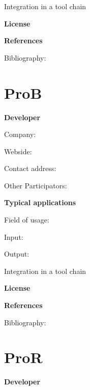 \documentclass{./template/openetcs_report}
\begin{document}
	Integration in a tool chain



	\textbf{License}


	\textbf{References}

	Bibliography:


\section{ProB}

	\textbf{Developer}

	Company: 

	Webside:

	Contact address:

	Other  Participators:



	\textbf{Typical applications}

	Field of usage:


	Input:

	Output:





	Integration in a tool chain



	\textbf{License}


	\textbf{References}

	Bibliography:


\section{ProR}

	\textbf{Developer}
\end{document}
